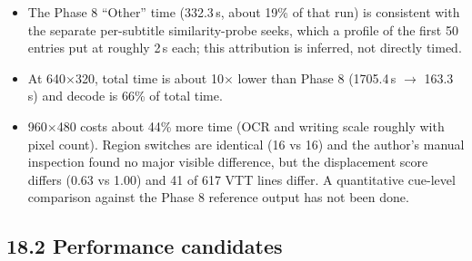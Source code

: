 \documentclass[11pt]{article}
\begin{document}
\medskip
\begin{itemize}[leftmargin=1.2em]
    \item The Phase 8 ``Other'' time (332.3\,s, about 19\% of that run) is consistent with the separate per-subtitle similarity-probe seeks, which a profile of the first 50 entries put at roughly 2\,s each; this attribution is inferred, not directly timed.
    \item At 640$\times$320, total time is about 10$\times$ lower than Phase 8 (1705.4\,s $\rightarrow$ 163.3\,s) and decode is 66\% of total time.
    \item 960$\times$480 costs about 44\% more time (OCR and writing scale roughly with pixel count). Region switches are identical (16 vs 16) and the author's manual inspection found no major visible difference, but the displacement score differs (0.63 vs 1.00) and 41 of 617 VTT lines differ. A quantitative cue-level comparison against the Phase 8 reference output has not been done.
\end{itemize}

\subsection*{18.2 Performance candidates}
\end{document}

